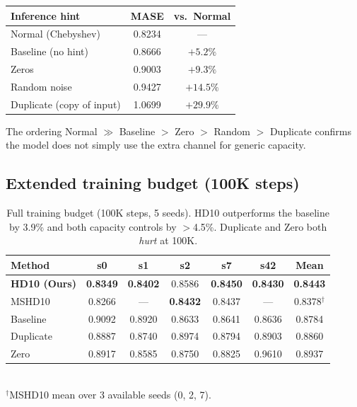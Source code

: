 \documentclass{article}
\begin{document}
\begin{center}
\small
\begin{tabular}{lcc}
\toprule
\textbf{Inference hint} & \textbf{MASE} & \textbf{vs.\ Normal} \\
\midrule
Normal (Chebyshev) & 0.8234 & --- \\
Baseline (no hint) & 0.8666 & $+5.2\%$ \\
Zeros & 0.9003 & $+9.3\%$ \\
Random noise & 0.9427 & $+14.5\%$ \\
Duplicate (copy of input) & 1.0699 & $+29.9\%$ \\
\bottomrule
\end{tabular}
\end{center}

The ordering Normal $\gg$ Baseline $>$ Zero $>$ Random $>$ Duplicate confirms the model does not simply use the extra channel for generic capacity.

\subsection{Extended training budget (100K steps)}

\begin{table}[t]
\centering
\caption{Full training budget (100K steps, 5 seeds). HD10 outperforms the baseline by 3.9\% and both capacity controls by $>$4.5\%. Duplicate and Zero both \emph{hurt} at 100K.}
\label{tab:100k}
\small
\begin{tabular}{lcccccc}
\toprule
\textbf{Method} & \textbf{s0} & \textbf{s1} & \textbf{s2} & \textbf{s7} & \textbf{s42} & \textbf{Mean} \\
\midrule
\textbf{HD10 (Ours)} & \textbf{0.8349} & \textbf{0.8402} & 0.8586 & \textbf{0.8450} & \textbf{0.8430} & \textbf{0.8443} \\
MSHD10 & 0.8266 & --- & \textbf{0.8432} & 0.8437 & --- & 0.8378$^\dagger$ \\
Baseline & 0.9092 & 0.8920 & 0.8633 & 0.8641 & 0.8636 & 0.8784 \\
Duplicate & 0.8887 & 0.8740 & 0.8974 & 0.8794 & 0.8903 & 0.8860 \\
Zero & 0.8917 & 0.8585 & 0.8750 & 0.8825 & 0.9610 & 0.8937 \\
\bottomrule
\end{tabular}
\\[2pt]
{\footnotesize $^\dagger$MSHD10 mean over 3 available seeds (0, 2, 7).}
\end{table}
\end{document}
